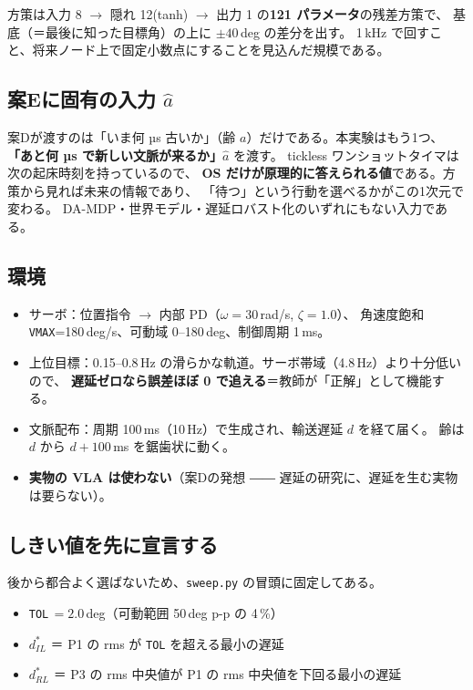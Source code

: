 \documentclass[11pt,a4paper]{article}
\newcommand{\code}[1]{\texttt{#1}}
\newcommand{\keyp}[1]{\textbf{\textcolor{blue!45!black}{#1}}}
\begin{document}
\noindent
方策は入力 8 $\to$ 隠れ 12(tanh) $\to$ 出力 1 の\keyp{121 パラメータ}の残差方策で、
基底（＝最後に知った目標角）の上に $\pm 40$\,deg の差分を出す。
1\,kHz で回すこと、将来ノード上で固定小数点にすることを見込んだ規模である。

\subsection{案Eに固有の入力 $\hat a$}

案Dが渡すのは「いま何 µs 古いか」（齢 $a$）だけである。本実験はもう1つ、
\keyp{「あと何 µs で新しい文脈が来るか」}$\hat a$ を渡す。
tickless ワンショットタイマは次の起床時刻を持っているので、
\keyp{OS だけが原理的に答えられる値}である。方策から見れば未来の情報であり、
「待つ」という行動を選べるかがこの1次元で変わる。
DA-MDP・世界モデル・遅延ロバスト化のいずれにもない入力である。

\subsection{環境}

\begin{itemize}[leftmargin=1.4em,itemsep=2pt]
  \item サーボ：位置指令 $\to$ 内部 PD（$\omega=30$\,rad/s, $\zeta=1.0$）、
        角速度飽和 \code{VMAX}=180\,deg/s、可動域 0--180\,deg、制御周期 1\,ms。
  \item 上位目標：0.15--0.8\,Hz の滑らかな軌道。サーボ帯域（4.8\,Hz）より十分低いので、
        \keyp{遅延ゼロなら誤差ほぼ 0 で追える}＝教師が「正解」として機能する。
  \item 文脈配布：周期 100\,ms（10\,Hz）で生成され、輸送遅延 $d$ を経て届く。
        齢は $d$ から $d+100$\,ms を鋸歯状に動く。
  \item \keyp{実物の VLA は使わない}（案Dの発想 ―― 遅延の研究に、遅延を生む実物は要らない）。
\end{itemize}

\subsection{しきい値を先に宣言する}

後から都合よく選ばないため、\code{sweep.py} の冒頭に固定してある。

\begin{itemize}[leftmargin=1.4em,itemsep=2pt]
  \item \code{TOL}\,$=2.0$\,deg（可動範囲 50\,deg p-p の 4\,\%）
  \item $d^{*}_{IL}$ ＝ P1 の rms が \code{TOL} を超える最小の遅延
  \item $d^{*}_{RL}$ ＝ P3 の rms 中央値が P1 の rms 中央値を下回る最小の遅延
\end{itemize}
\end{document}
